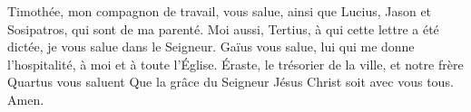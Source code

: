 Timothée, mon compagnon de travail, vous salue,
	ainsi que Lucius, Jason et Sosipatros, qui sont de ma parenté.
Moi aussi, Tertius, à qui cette lettre a été dictée,
	je vous salue dans le Seigneur.
Gaïus vous salue, lui qui me donne l’hospitalité, à moi et à toute l’Église.
	Éraste, le trésorier de la ville, et notre frère Quartus vous saluent
Que la grâce du Seigneur Jésus Christ soit avec vous tous. Amen.
